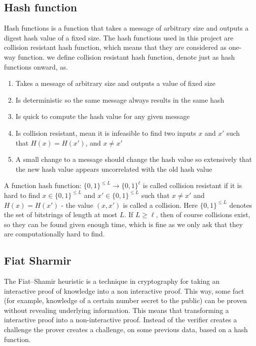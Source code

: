 \subsection{Hash function}
Hash functions is a function that takes a message of arbitrary size and outputs a digest hash value of a fixed size. The hash functions used in this project are collision resistant hash function, which means that they are considered as one-way function. we define collision resistant hash function, denote just as hash functions onward, as.

\begin{defi}
\begin{enumerate}
    \item Takes a message of arbitrary size and outputs a value of fixed size
    \item Is deterministic so the same message always results in the same hash
    \item Is quick to compute the hash value for any given message
    \item Is collision resistant, mean it is infeasible to find two inputs $x$ and $x'$ such that $H(x) = H(x')$, and $x \neq x'$
    \item A small change to a message should change the hash value so extensively that the new hash value appears uncorrelated with the old hash value
\end{enumerate}
\end{defi}

A function hash function: $\{0,1\}^{\leq L} \rightarrow \{0,1\}^\ell$ is called collision resistant if it is hard to find $x \in \{0,1\}^{\leq L}$ and $x' \in \{0,1\}^{\leq L}$ such that $x \neq x'$ and $H(x)=H(x')$ - the value $(x,x')$ is called a collision. Here $\{0,1\}^{\leq L}$ denotes the set of bitstrings of length at most $L$. If $L \geq \ell$, then of course collisions exist, so they can be found given enough time, which is fine as we only ask that they are computationally hard to find.  

\subsection{Fiat Sharmir}
The Fiat–Shamir heuristic is a technique in cryptography for taking an interactive proof of knowledge into a non interactive proof. This way, some fact (for example, knowledge of a certain number secret to the public) can be proven without revealing underlying information. This means that transforming a interactive proof into a non-interactive proof. Instead of the verifier creates a challenge the prover creates a challenge, on some previous data, based on a hash function.


